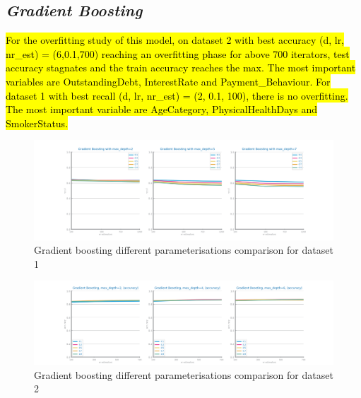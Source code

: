 \documentclass[10pt]{extarticle}
\newcommand{\ctext}[3][RGB]{%
  \begingroup
  \definecolor{hlcolor}{#1}{#2}\sethlcolor{hlcolor}%
  \hl{#3}%
  \endgroup
}
\begin{document}
\subsection*{\textit{Gradient Boosting}}
\ctext[RGB]{190,190,190}{For the overfitting study of this model, on dataset 2 with best accuracy (d, lr, nr\_est) = (6,0.1,700) reaching an overfitting phase for above 700 iterators, test accuracy stagnates and the train accuracy reaches the max. The most important variables are OutstandingDebt, InterestRate and Payment\_Behaviour.
For dataset 1 with best recall (d, lr, nr\_est) = (2, 0.1, 100), there is no overfitting. The most important variable are AgeCategory, PhysicalHealthDays and SmokerStatus.  }
\begin{figure}[H]
\centering\includegraphics[scale=0.60]{images/dataset1/models_evaluation/CovidPos_gb_recall_study.png}
\caption{Gradient boosting different parameterisations comparison for dataset 1}
\end{figure}

\begin{figure}[H]
\centering\includegraphics[scale=0.60]{images/dataset2/models_evaluation/Credit_Score_gb_study.png}
\caption{Gradient boosting different parameterisations comparison for dataset 2}
\end{figure}
\end{document}
